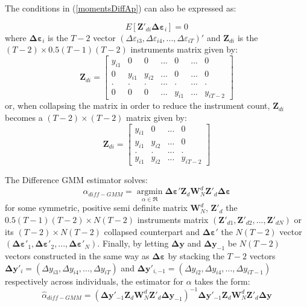 \documentclass[12pt,a4paper,english]{article}%
\begin{document}
The conditions in (\ref{momentsDiffAp}) can also be expressed as:

\begin{equation*}
E\left[ \mathbf{Z}'_{di}\mathbf{\Delta \varepsilon}_{i}\right]=0
\end{equation*}
where $\mathbf{\Delta \varepsilon}_{i}$ is the $T-2$ vector $(\Delta \varepsilon_{i3},\Delta \varepsilon_{i4},...,\Delta \varepsilon_{iT})'$ and $\mathbf{Z}_{di}$ is the $(T-2)\times 0.5(T-1)(T-2)$ instruments matrix given by:
\[
\mathbf{Z}_{di} = \left[ {\begin{array}{*{20}{c}}
{{y_{i1}}}&0&0&{...}&0&{...}&0\\
0&{{y_{i1}}}&{{y_{i2}}}&{...}&0&{...}&0\\
.&.&.&{...}&.&{...}&.\\
0&0&0&{...}&{{y_{i1}}}&{...}&{{y_{iT - 2}}}
\end{array}} \right]
\]
or, when collapsing the matrix in order to reduce the instrument count, $\mathbf{Z}_{di}$ becomes a $(T-2)\times (T-2)$ matrix given by:
\[
\mathbf{Z}_{di} = \left[ {\begin{array}{*{20}{c}}
{{y_{i1}}}&0&{...}&0\\
{{y_{i1}}}&{{y_{i2}}}&{...}&0\\
.&.&{...}&.\\
{{y_{i1}}}&{{y_{i2}}}&{...}&{{y_{iT - 2}}}
\end{array}} \right]
\]

The Difference GMM estimator solves:
\[
{{\hat \alpha }_{diff - GMM}} = \mathop {\arg \min }\limits_{\alpha  \in \Re } \mathbf{\Delta \varepsilon}' \mathbf{Z}_{d}{\mathbf{W}_{N}^d}\mathbf{Z}'_{d}\mathbf{\Delta \varepsilon} 
\]
for some symmetric, positive semi definite matrix $\mathbf{W}_{N}^d$, $\mathbf{Z}'_{d}$ the $0.5(T-1)(T-2)\times N(T-2)$ instruments matrix $(\mathbf{Z}'_{d1},\mathbf{Z}'_{d2},...,\mathbf{Z}'_{dN})$ or its $(T-2)\times N(T-2)$ collapsed counterpart and $\mathbf{\Delta \varepsilon}'$ the $N(T-2)$ vector $(\mathbf{\Delta \varepsilon}'_1,\mathbf{\Delta \varepsilon}'_2,...,\mathbf{\Delta \varepsilon}'_N)$. Finally, by letting $\mathbf{\Delta y}$ and $\mathbf{\Delta y}_{-1}$ be $N(T-2)$ vectors constructed in the same way as $\mathbf{\Delta \varepsilon}$ by stacking the $T-2$ vectors $\mathbf{\Delta y}'_i=(\Delta y_{i3},\Delta y_{i4},...,\Delta y_{iT})$ and $\mathbf{\Delta y}'_{i,-1}=(\Delta y_{i2},\Delta y_{i4},...,\Delta y_{iT-1})$ respectively across individuals, the estimator for $\alpha$ takes the form:
\[
{{\hat \alpha }_{diff - GMM}} = {\left( \mathbf{\Delta y}'_{-1}\mathbf{Z}_d \mathbf{W}_{N}^d \mathbf{Z}'_d \mathbf{\Delta y}_{-1} \right)^{ - 1}} \mathbf{\Delta y}'_{-1}\mathbf{Z}_d \mathbf{W}_{N}^d \mathbf{Z}'_d \mathbf{\Delta y} 
\]
\end{document}
